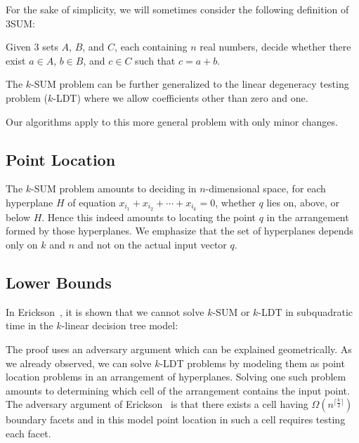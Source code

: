 For the sake of simplicity, we will sometimes consider the following definition of 3SUM\@:
\begin{problem}[3SUM]
Given 3 sets $A$, $B$, and $C$, each containing $n$ real numbers, decide
whether there exist $a \in A$, $b \in B$, and $c \in C$ such that $c=a+b$.
\end{problem}

The \(k\)-SUM problem can be further generalized to the
linear degeneracy testing problem (\(k\)-LDT) where we allow
coefficients other than zero and one.
%

%
Our algorithms apply to this more general problem with only minor changes.




\subsection{Point Location}

The \(k\)-SUM problem amounts to deciding in $n$-dimensional space, for each hyperplane
\(H\) of equation \(x_{i_1} + x_{i_2} + \cdots +x_{i_k} = 0\), whether \(q\)
lies on, above, or below \(H\). Hence this indeed amounts to locating the point
$q$ in the arrangement formed by those hyperplanes. We emphasize that the set
of hyperplanes depends only on $k$ and $n$ and not on the actual input vector
$q$.



\subsection{Lower Bounds}

In Erickson~\cite{Er99a}, it is shown that we cannot solve \(k\)-SUM or
\(k\)-LDT in subquadratic time in the \(k\)-linear decision tree model:
%

%
The proof uses an adversary argument which can be explained geometrically. As
we already observed, we can solve \(k\)-LDT problems by modeling them as point
location problems in an arrangement of hyperplanes. Solving one such problem
amounts to determining which cell of the arrangement contains the input point.
The adversary argument of Erickson~\cite{Er99a} is that there exists a cell having
$\Omega(n^{\lceil\frac{k}{2}\rceil})$ boundary facets and in this model point
location in such a cell requires testing each facet.

